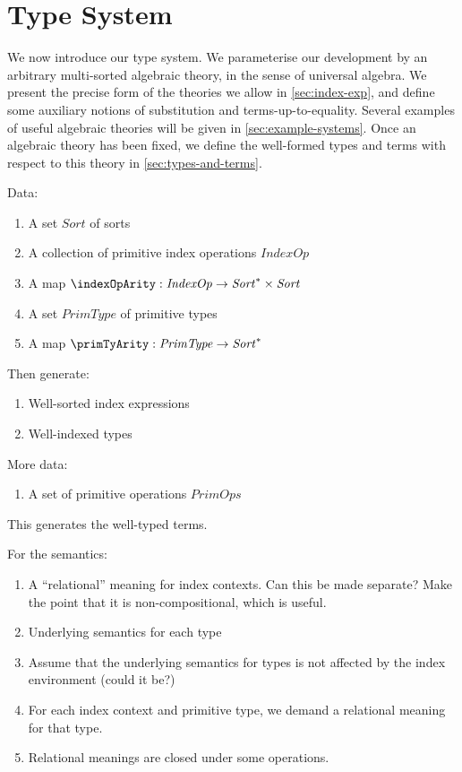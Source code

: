 \section{Type System}

We now introduce our type system. We parameterise our development by
an arbitrary multi-sorted algebraic theory, in the sense of universal
algebra. We present the precise form of the theories we allow in
\autoref{sec:index-exp}, and define some auxiliary notions of
substitution and terms-up-to-equality. Several examples of useful
algebraic theories will be given in
\autoref{sec:example-systems}. Once an algebraic theory has been
fixed, we define the well-formed types and terms with respect to this
theory in \autoref{sec:types-and-terms}. 

Data:
\begin{enumerate}
\item A set $\mathit{Sort}$ of sorts
\item A collection of primitive index operations $\mathit{IndexOp}$
\item A map $\indexOpArity : \mathit{IndexOp} \to \mathit{Sort}^* \times \mathit{Sort}$
\item A set $\mathit{PrimType}$ of primitive types
\item A map $\primTyArity : \mathit{PrimType} \to \mathit{Sort}^*$
\end{enumerate}

Then generate:
\begin{enumerate}
\item Well-sorted index expressions
\item Well-indexed types
\end{enumerate}

More data:
\begin{enumerate}
\item A set of primitive operations $\mathit{PrimOps}$
\end{enumerate}

This generates the well-typed terms. 

For the semantics:
\begin{enumerate}
\item A ``relational'' meaning for index contexts. Can this be made
  separate? Make the point that it is non-compositional, which is
  useful. 
\item Underlying semantics for each type
\item Assume that the underlying semantics for types is not affected
  by the index environment (could it be?)
\item For each index context and primitive type, we demand a
  relational meaning for that type.
\item Relational meanings are closed under some operations.
\end{enumerate}

